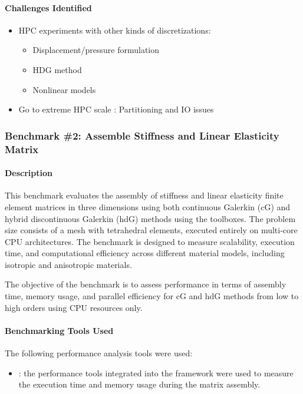 \paragraph{Challenges Identified}

\begin{itemize}
\item HPC experiments with other kinds of discretizations:
  \begin{itemize}
  \item Displacement/pressure formulation
  \item HDG method
  \item Nonlinear models
  \end{itemize}
\item Go to extreme HPC scale : Partitioning and IO issues
\end{itemize}

\iffalse
\subsubsection{Benchmark \#2: Assemble Stiffness and Linear Elasticity Matrix}

\paragraph{Description}
This benchmark evaluates the assembly of stiffness and linear elasticity finite element matrices in three dimensions using both continuous Galerkin (cG) and hybrid discontinuous Galerkin (hdG) methods using the \Feelpp toolboxes.
The problem size consists of a mesh with tetrahedral elements, executed entirely on multi-core CPU architectures.
The benchmark is designed to measure scalability, execution time, and computational efficiency across different material models, including isotropic and anisotropic materials.

The objective of the benchmark is to assess performance in terms of assembly time, memory usage, and parallel efficiency for cG and hdG methods from low to high orders using CPU resources only.

\paragraph{Benchmarking Tools Used}
The following performance analysis tools were used:
\begin{itemize}
    \item \textbf{\Feelpp}: the performance tools integrated into the \Feelpp framework were used to measure the execution time and memory usage during the matrix assembly.
\end{itemize}

